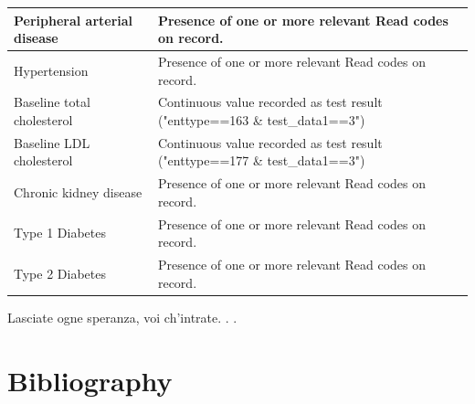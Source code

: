 \documentclass[a4paper, twoside]{templates/ociamthesis}
\begin{document}
\begin{table}[H]
\begin{tabular}[t]{>{\raggedright\arraybackslash}p{15em}>{\centering\arraybackslash}p{25em}}
\midrule
Peripheral arterial disease & Presence of one or more relevant Read codes on record.\\
\midrule
\addlinespace
Hypertension & Presence of one or more relevant Read codes on record.\\
\midrule
Baseline total cholesterol & Continuous value recorded as test result ("enttype==163 \& test\_data1==3")\\
\midrule
Baseline LDL cholesterol & Continuous value recorded as test result ("enttype==177 \& test\_data1==3")\\
\midrule
Chronic kidney disease & Presence of one or more relevant Read codes on record.\\
\midrule
Type 1 Diabetes & Presence of one or more relevant Read codes on record.\\
\midrule
\addlinespace
Type 2 Diabetes & Presence of one or more relevant Read codes on record.\\
\bottomrule
\end{tabular}
\end{table}

\begin{savequote}
Lasciate ogne speranza, voi ch'intrate. . .
\end{savequote}

\hypertarget{bibliography}{%
\chapter{Bibliography}\label{bibliography}}
\end{document}
